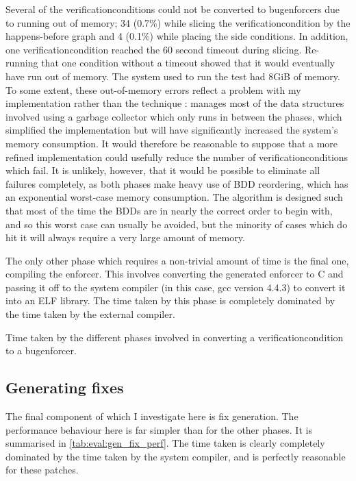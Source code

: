 Several of the \glspl{verificationcondition} could not be converted to
\glspl{bugenforcer} due to running out of memory; 34 (0.7\%) while
slicing the \gls{verificationcondition} by the happens-before graph
and 4 (0.1\%) while placing the side conditions.  In addition, one
\gls{verificationcondition} reached the 60 second timeout during
slicing.  Re-running that one condition without a timeout showed that
it would eventually have run out of memory.  The system used to run
the test had 8GiB of memory.  To some extent, these out-of-memory
errors reflect a problem with my implementation {\implementation}
rather than the technique {\technique}: {\implementation} manages most
of the data structures involved using a garbage collector which only
runs in between the phases, which simplified the implementation but
will have significantly increased the system's memory consumption.  It
would therefore be reasonable to suppose that a more refined
implementation could usefully reduce the number of
\glspl{verificationcondition} which fail.  It is unlikely, however,
that it would be possible to eliminate all failures completely, as
both phases make heavy use of BDD reordering, which has an exponential
worst-case memory consumption.  The algorithm is designed such that
most of the time the BDDs are in nearly the correct order to begin
with, and so this worst case can usually be avoided, but the minority
of cases which do hit it will always require a very large amount of
memory.

The only other phase which requires a non-trivial amount of time is
the final one, compiling the enforcer.  This involves converting the
generated enforcer to C and passing it off to the system compiler (in
this case, gcc version 4.4.3) to convert it into an ELF library.  The
time taken by this phase is completely dominated by the time taken by
the external compiler.

\begin{sanefig}
  \caption{Time taken by the different phases involved in converting a
    \gls{verificationcondition} to a \gls{bugenforcer}.}
  \label{fig:eval:time_breakdown:convert_to_enforcer}
\end{sanefig}

\subsection{Generating fixes}
\label{sect:eval:genfix}

The final component of {\technique} which I investigate here is fix
generation.  The performance behaviour here is far simpler than for
the other phases.  It is summarised in
\autoref{tab:eval:gen_fix_perf}.  The time taken is clearly completely
dominated by the time taken by the system compiler, and is perfectly
reasonable for these patches.

